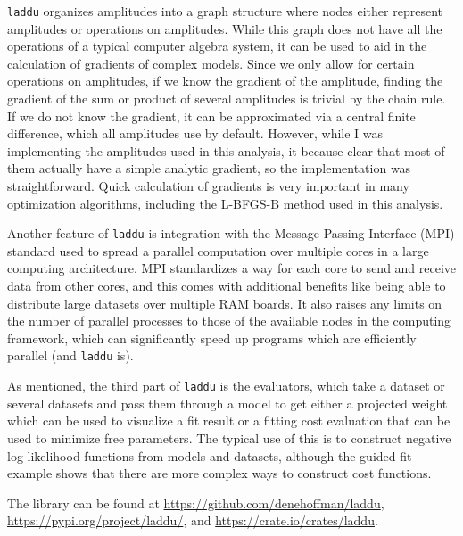 \texttt{laddu} organizes amplitudes into a graph structure where nodes either represent amplitudes or operations on amplitudes. While this graph does not have all the operations of a typical computer algebra system, it can be used to aid in the calculation of gradients of complex models. Since we only allow for certain operations on amplitudes, if we know the gradient of the amplitude, finding the gradient of the sum or product of several amplitudes is trivial by the chain rule. If we do not know the gradient, it can be approximated via a central finite difference, which all amplitudes use by default. However, while I was implementing the amplitudes used in this analysis, it because clear that most of them actually have a simple analytic gradient, so the implementation was straightforward. Quick calculation of gradients is very important in many optimization algorithms, including the L-BFGS-B method used in this analysis.

Another feature of \texttt{laddu} is integration with the Message Passing Interface (MPI) standard used to spread a parallel computation over multiple cores in a large computing architecture. MPI standardizes a way for each core to send and receive data from other cores, and this comes with additional benefits like being able to distribute large datasets over multiple RAM boards. It also raises any limits on the number of parallel processes to those of the available nodes in the computing framework, which can significantly speed up programs which are efficiently parallel (and \texttt{laddu} is).

As mentioned, the third part of \texttt{laddu} is the evaluators, which take a dataset or several datasets and pass them through a model to get either a projected weight which can be used to visualize a fit result or a fitting cost evaluation that can be used to minimize free parameters. The typical use of this is to construct negative log-likelihood functions from models and datasets, although the guided fit example shows that there are more complex ways to construct cost functions.

The library can be found at \url{https://github.com/denehoffman/laddu}, \url{https://pypi.org/project/laddu/}, and \url{https://crate.io/crates/laddu}.
